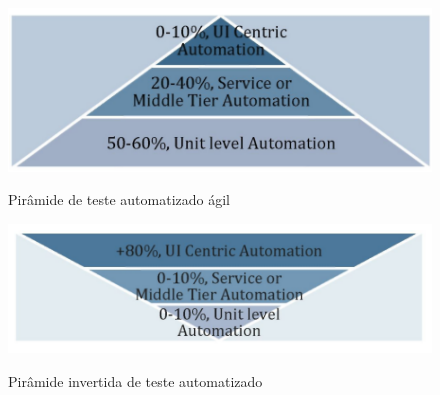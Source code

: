 \documentclass[
	12pt,				%
	openright,			%
	oneside,			%
	a4paper,			%
	english,			%
	brazil,				%
	]{abntex2}
\begin{document}

\begin{figure}[H]
    \centering
    \caption{Pirâmide de teste automatizado ágil}
    \graphicspath{ {./graphics/agile/} }
    \includegraphics[scale=1.0]{testing-pyramid-agile}
    \label{fig:testing-pyramid-agile}
\end{figure}

\begin{figure}[H]
    \centering
    \caption{Pirâmide invertida de teste automatizado}
    \graphicspath{ {./graphics/agile/} }
    \includegraphics[scale=1.0]{testing-pyramid-traditional}
    \label{fig:testing-pyramid-traditional}
\end{figure}
\end{document}
